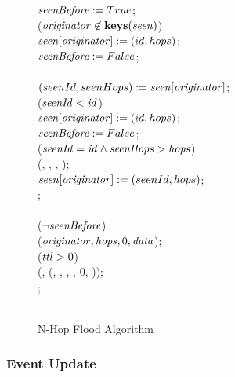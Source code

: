 \begin{figure}[H]
\begin{boxedminipage}{\linewidth}
    \null\qq\qq $\mbox{\emph{seenBefore}} \mathrel{:=} True$;\\
    \null\qq\qq {} ($\mbox{\emph{originator}} \not\in \mbox{\textbf{keys}}(\mbox{\emph{seen}}) $) \\
    \null\qq\qq\qq $\mbox{\emph{seen}}[\mbox{\emph{originator}}] \mathrel{:=} (id, hops)$;\\
    \null\qq\qq\qq $\mbox{\emph{seenBefore}} \mathrel{:=} False$;\\
    \null\qq\qq {} \\
    \null\qq\qq\qq $(seenId, seenHops) \mathrel{:=} \mbox{\emph{seen}}[\mbox{\emph{originator}}]$;\\
    \null\qq\qq\qq {} ($\mbox{\emph{seenId}} < \mbox{\emph{id}}$) \\
    \null\qq\qq\qq\qq $\mbox{\emph{seen}}[\mbox{\emph{originator}}] \mathrel{:=} (id, hops)$;\\
    \null\qq\qq\qq\qq $\mbox{\emph{seenBefore}} \mathrel{:=} False$;\\
    \null\qq\qq\qq {} ($\mbox{\emph{seenId}} = \mbox{\emph{id}} \land \mbox{\emph{seenHops}} > \mbox{\emph{hops}}$) \\
    \null\qq\qq\qq\qq {}(, , , );\\
    \null\qq\qq\qq\qq $\mbox{\emph{seen}}[\mbox{\emph{originator}}] \mathrel{:=} (seenId, hops)$;\\
    \null\qq\qq\qq {};\\
    \null\qq\qq {}\\
    \null\qq\qq {} ($\lnot\mbox{\emph{seenBefore}}$) \\
    \null\qq\qq\qq {}($\mbox{\emph{originator}}, \mbox{\emph{hops}}, 0, \mbox{\emph{data}}$);\\
    \null\qq\qq\qq {} ($\mbox{\emph{ttl}} > 0$) \\
    \null\qq\qq\qq\qq {}(, (, , , , 0, )); \\
    \null\qq\qq\qq {};\\
    \null\qq\qq {}\\
  \end{boxedminipage}
  \caption{N-Hop Flood Algorithm}
  \label{fig:n-hop-flood-algorithm}
\end{figure}

\subsubsection{Event Update}

